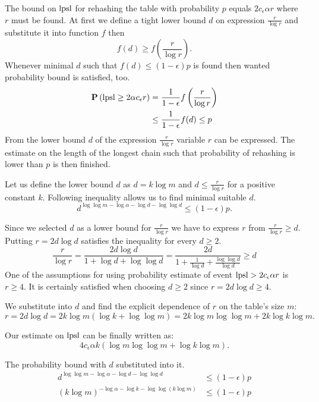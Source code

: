 The bound on $\mathrm{lpsl}$ for rehashing the table with probability $p$ equals $2 c_\epsilon \alpha r$ where $r$ must be found. At first we define a tight lower bound $d$ on expression $\frac{r}{\log r}$ and substitute it into function $f$ then \[ f(d) \geq f\left(\frac{r}{\log r}\right) \text{.} \] Whenever minimal $d$ such that $f(d) \leq (1 - \epsilon) p$ is found then wanted probability bound is satisfied, too.
\[ 
\begin{split}
\mathbf{P}\left(\mathrm{lpsl} \geq 2 \alpha c_\epsilon r\right) 
	& = \frac{1}{1 - \epsilon} f\left(\frac{r}{\log r}\right) \\
	& \leq \frac{1}{1-\epsilon}f(d) \leq p \\
\end{split}
\]
From the lower bound $d$ of the expression $\frac{r}{\log r}$ variable $r$ can be expressed. The estimate on the length of the longest chain such that probability of rehashing is lower than $p$ is then finished.

Let us define the lower bound $d$ as $d = k \log m$ and $d \leq \frac{r}{\log r}$ for a positive constant $k$. Following inequality allows us to find minimal suitable $d$.
\[
d ^ {\log \log m - \log \alpha - \log d - \log \log d} \leq (1 - \epsilon) p \text{.}
\]

Since we selected $d$ as a lower bound for $\frac{r}{\log r}$ we have to express $r$ from $\frac{r}{\log r} \geq d$. Putting $r = 2 d \log d$ satisfies the inequality for every $d \geq 2$.
\begin{displaymath}
\frac{r}{\log r} = \frac{2 d \log d}{1 + \log d + \log \log d} = \frac{2 d}{1 + \frac{1}{\log d} + \frac{\log \log d}{\log d}} \geq d
\end{displaymath}
One of the assumptions for using probability estimate of event $\mathrm{lpsl} > 2 c_\epsilon \alpha r$ is $r \geq 4$. It is certainly satisfied when choosing $d \geq 2$ since $r = 2 d \log d \geq 4$.

We substitute into $d$ and find the explicit dependence of $r$ on the table's size $m$:
\begin{displaymath}
r = 2 d \log d = 2 k \log m (\log k + \log \log m) = 2 k \log m \log \log m + 2 k \log k \log m \text{.}
\end{displaymath}

Our estimate on $\mathrm{lpsl}$ can be finally written as:
\[
4 c_\epsilon \alpha k (\log m \log \log m + \log k \log m) \text{.}
\]

The probability bound with $d$ substituted into it.
\[
\begin{split}
d ^ {\log \log m - \log \alpha - \log d -\log \log d} & \leq (1 - \epsilon)p \\
\left(k \log m\right)^{-\log \alpha -\log k - \log \log (k \log m)} & \leq (1 - \epsilon)p \\
\end{split}
\]

